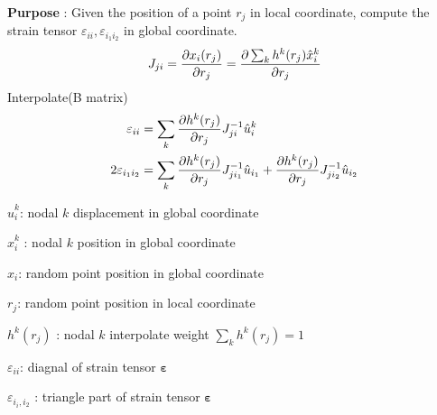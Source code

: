 \documentclass[landscape,a0paper,fontscale=0.285]{baposter} %
\begin{document}
\begin{poster}
{\colorbox[HTML]{CCFFFF}{}

\textbf{Purpose} : Given the position of a point $r_j$ in local coordinate, compute the strain tensor $\varepsilon_{ii},\varepsilon_{i_1i_2}$ in global coordinate.
\vspace{-0.4cm}
$$\vspace{-0.4cm}
J_{ji} = \frac{\partial x_i(r_j)}{\partial r_j} = \frac{\partial \sum_k h^k(r_j)\hat x_i^k}{\partial r_j}
$$
\vspace{-0.4cm}
Interpolate(B matrix)
$$\vspace{-0.4cm}
\begin{aligned}
\varepsilon_{ii} &= \sum_k \frac{\partial h^k(r_j)}{\partial r_j}J_{ji}^{-1}\hat u_i^k
\\
2\varepsilon_{i_1i_2} &= \sum_k \frac{\partial h^k(r_j)}{\partial r_j}J_{j{i_1}}^{-1}\hat u_{i_1} + \frac{\partial h^k(r_j)}{\partial r_j}J_{j{i_2}}^{-1}\hat u_{i_2}
\end{aligned}
$$

$\hat u^k_i $: nodal $k$ displacement in global coordinate

$\hat x^k_i$ : nodal $k$ position in global coordinate

$x_i$: random point position in global coordinate

$r_j$: random point position in local coordinate 

$h^k(r_j)$ : nodal $k$ interpolate weight $\sum_k h^k(r_j) = 1$

$\varepsilon_{ii}$: diagnal of strain tensor $\boldsymbol \varepsilon$

$\varepsilon_{i_i,i_2}$ : triangle part of strain tensor  $\boldsymbol \varepsilon$



}

\end{poster}
\end{document}
